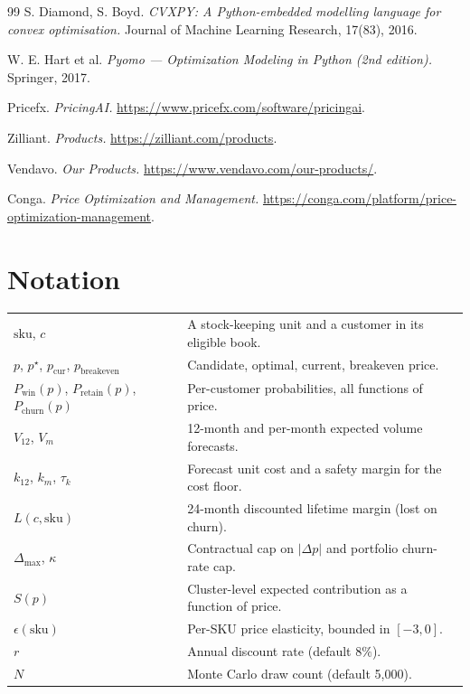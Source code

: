 \documentclass[11pt,a4paper]{article}
\newcommand{\sku}{\mathrm{sku}}
\begin{document}
\begin{thebibliography}{99}
S. Diamond, S. Boyd. \emph{CVXPY: A Python-embedded modelling language for convex optimisation.} Journal of Machine Learning Research, 17(83), 2016.

W. E. Hart et al. \emph{Pyomo --- Optimization Modeling in Python (2nd edition).} Springer, 2017.

Pricefx. \emph{PricingAI.} \url{https://www.pricefx.com/software/pricingai}.

Zilliant. \emph{Products.} \url{https://zilliant.com/products}.

Vendavo. \emph{Our Products.} \url{https://www.vendavo.com/our-products/}.

Conga. \emph{Price Optimization and Management.} \url{https://conga.com/platform/price-optimization-management}.

\end{thebibliography}

\appendix
\section{Notation}
\label{app:notation}
\begin{tabularx}{\textwidth}{lX}
\toprule
$\sku$, $c$ & A stock-keeping unit and a customer in its eligible book. \\
$p$, $p^\star$, $p_{\text{cur}}$, $p_{\text{breakeven}}$ & Candidate, optimal, current, breakeven price. \\
$P_{\text{win}}(p)$, $P_{\text{retain}}(p)$, $P_{\text{churn}}(p)$ & Per-customer probabilities, all functions of price. \\
$V_{12}$, $V_m$ & 12-month and per-month expected volume forecasts. \\
$k_{12}$, $k_m$, $\tau_k$ & Forecast unit cost and a safety margin for the cost floor. \\
$L(c,\sku)$ & 24-month discounted lifetime margin (lost on churn). \\
$\Delta_{\max}$, $\kappa$ & Contractual cap on $|\Delta p|$ and portfolio churn-rate cap. \\
$S(p)$ & Cluster-level expected contribution as a function of price. \\
$\epsilon(\sku)$ & Per-SKU price elasticity, bounded in $[-3, 0]$. \\
$r$ & Annual discount rate (default $8\%$). \\
$N$ & Monte Carlo draw count (default 5,000). \\
\bottomrule
\end{tabularx}
\end{document}
